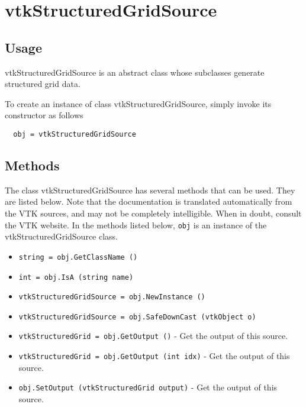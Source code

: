 \section{vtkStructuredGridSource}

\subsection{Usage}

 vtkStructuredGridSource is an abstract class whose subclasses generate
 structured grid data.

To create an instance of class vtkStructuredGridSource, simply
invoke its constructor as follows
\begin{verbatim}
  obj = vtkStructuredGridSource
\end{verbatim}
\subsection{Methods}

The class vtkStructuredGridSource has several methods that can be used.
  They are listed below.
Note that the documentation is translated automatically from the VTK sources,
and may not be completely intelligible.  When in doubt, consult the VTK website.
In the methods listed below, \verb|obj| is an instance of the vtkStructuredGridSource class.
\begin{itemize}
\item  \verb|string = obj.GetClassName ()|

\item  \verb|int = obj.IsA (string name)|

\item  \verb|vtkStructuredGridSource = obj.NewInstance ()|

\item  \verb|vtkStructuredGridSource = obj.SafeDownCast (vtkObject o)|

\item  \verb|vtkStructuredGrid = obj.GetOutput ()| -  Get the output of this source.

\item  \verb|vtkStructuredGrid = obj.GetOutput (int idx)| -  Get the output of this source.

\item  \verb|obj.SetOutput (vtkStructuredGrid output)| -  Get the output of this source.

\end{itemize}
